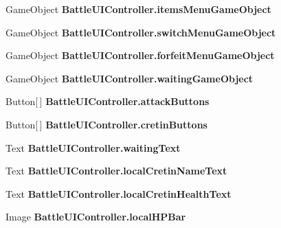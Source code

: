 \begin{DoxyCompactItemize}
\item 
\hypertarget{group__client_gaf99e8408c55ed31be12051692750cb97}{Game\-Object {\bfseries Battle\-U\-I\-Controller.\-items\-Menu\-Game\-Object}}\label{group__client_gaf99e8408c55ed31be12051692750cb97}

\item 
\hypertarget{group__client_ga980ceadc6a8df5e2993b6fc97dc89083}{Game\-Object {\bfseries Battle\-U\-I\-Controller.\-switch\-Menu\-Game\-Object}}\label{group__client_ga980ceadc6a8df5e2993b6fc97dc89083}

\item 
\hypertarget{group__client_gaf29f6bee62095208f55a9d3fee5a628c}{Game\-Object {\bfseries Battle\-U\-I\-Controller.\-forfeit\-Menu\-Game\-Object}}\label{group__client_gaf29f6bee62095208f55a9d3fee5a628c}

\item 
\hypertarget{group__client_gad6f40ffcec5911934218836218995e41}{Game\-Object {\bfseries Battle\-U\-I\-Controller.\-waiting\-Game\-Object}}\label{group__client_gad6f40ffcec5911934218836218995e41}

\item 
\hypertarget{group__client_ga57dc6e1b53d2412dd00eb29859bac337}{Button\mbox{[}$\,$\mbox{]} {\bfseries Battle\-U\-I\-Controller.\-attack\-Buttons}}\label{group__client_ga57dc6e1b53d2412dd00eb29859bac337}

\item 
\hypertarget{group__client_ga188d6c1d20ceab7503469b77818cb7fc}{Button\mbox{[}$\,$\mbox{]} {\bfseries Battle\-U\-I\-Controller.\-cretin\-Buttons}}\label{group__client_ga188d6c1d20ceab7503469b77818cb7fc}

\item 
\hypertarget{group__client_ga2f5cb0c646d3675c7c7805381d7e54d2}{Text {\bfseries Battle\-U\-I\-Controller.\-waiting\-Text}}\label{group__client_ga2f5cb0c646d3675c7c7805381d7e54d2}

\item 
\hypertarget{group__client_ga72b6e8ee777e63e4cbcf7a51cede53ed}{Text {\bfseries Battle\-U\-I\-Controller.\-local\-Cretin\-Name\-Text}}\label{group__client_ga72b6e8ee777e63e4cbcf7a51cede53ed}

\item 
\hypertarget{group__client_ga77e347d67633680a65e9adf1f790176a}{Text {\bfseries Battle\-U\-I\-Controller.\-local\-Cretin\-Health\-Text}}\label{group__client_ga77e347d67633680a65e9adf1f790176a}

\item 
\hypertarget{group__client_ga2b64cecb96ddcc2f7dfdeb062ed1869e}{Image {\bfseries Battle\-U\-I\-Controller.\-local\-H\-P\-Bar}}\label{group__client_ga2b64cecb96ddcc2f7dfdeb062ed1869e}


\end{DoxyCompactItemize}
